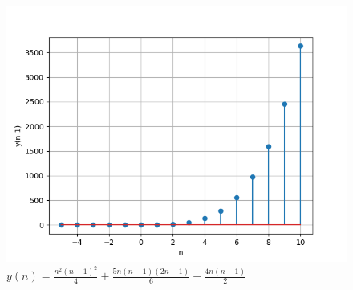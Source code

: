 \documentclass[journal,12pt,twocolumn]{IEEEtran}
\theoremstyle{remark}
\begin{document}
    \begin{figure}[!h] 
    \centering
    \includegraphics[width=\columnwidth]{figs/sumplot.png}
    \caption{$y(n)=\frac{n^2(n-1)^2}{4} + \frac{5n(n-1)(2n-1)}{6} + \frac{4n(n-1)}{2}$}
    \label{fig:Graph1_math.11.9.4.8}
    \end{figure}
\end{document}
